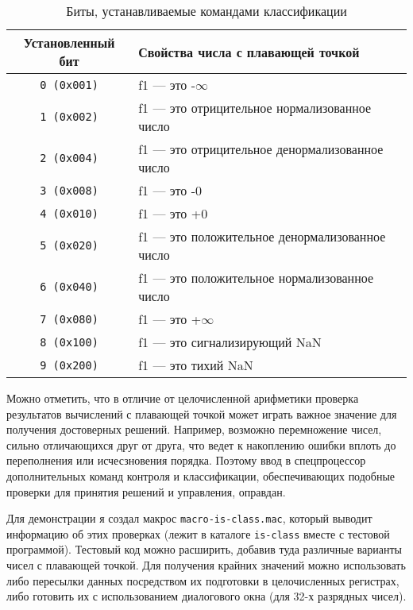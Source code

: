 \begin{table}[h]
    \caption{Биты, устанавливаемые командами классификации}
    \centering
    \begin{tabularx}{\textwidth}{|c|X|}
        \hline
        \textbf{Установленный бит} & \textbf{Свойства числа с плавающей точкой} \\
        \hline \verb|0 (0x001)| & f1 --- это -$\infty$  \\
        \hline \verb|1 (0x002)| & f1 --- это отрицительное нормализованное число \\
        \hline \verb|2 (0x004)| & f1 --- это отрицительное денормализованное число \\
        \hline \verb|3 (0x008)| & f1 --- это -0 \\
        \hline \verb|4 (0x010)| & f1 --- это +0 \\
        \hline \verb|5 (0x020)| & f1 --- это положительное денормализованное число \\
        \hline \verb|6 (0x040)| & f1 --- это положительное нормализованное число \\
        \hline \verb|7 (0x080)| & f1 --- это +$\infty$ \\
        \hline \verb|8 (0x100)| & f1 --- это сигнализирующий NaN \\
        \hline \verb|9 (0x200)| & f1 --- это тихий NaN \\
        \hline
    \end{tabularx}
    \label{table-fclass-mask}
\end{table}

Можно отметить, что в отличие от целочисленной арифметики проверка результатов вычислений с плавающей точкой может играть важное значение для получения достоверных решений. Например, возможно перемножение чисел, сильно отличающихся друг от друга, что ведет к накоплению ошибки вплоть до переполнения или исчесзновения порядка. Поэтому ввод в спецпроцессор дополнительных команд контроля и классификации, обеспечивающих подобные проверки для принятия решений и управления, оправдан.

Для демонстрации я создал макрос \verb|macro-is-class.mac|, который выводит информацию об этих проверках (лежит в каталоге \verb|is-class| вместе с тестовой программой). Тестовый код можно расширить, добавив туда различные варианты чисел с плавающей точкой. Для получения крайних значений можно использовать либо пересылки данных посредством их подготовки в целочисленных регистрах, либо готовить их с использованием диалогового окна (для 32-х разрядных чисел).

